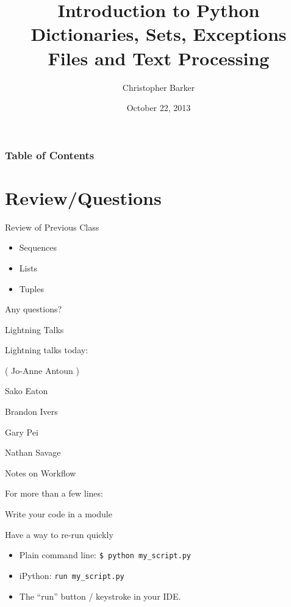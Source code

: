 \documentclass{beamer}
\title[Intro to Python: Week 4]{Introduction  to Python\\ Dictionaries, Sets, Exceptions\\ Files and Text Processing}
\author{Christopher Barker}
\institute{UW Continuing Education}
\date{October 22, 2013}
\begin{document}
\begin{frame}
  \titlepage
\end{frame}

\begin{frame}
\frametitle{Table of Contents}
  \tableofcontents
\end{frame}


\section{Review/Questions}

\begin{frame}{Review of Previous Class}

\begin{itemize}
  \item Sequences
  \item Lists
  \item Tuples
\end{itemize}

\vfill
{\Large Any questions?}

\end{frame}


\begin{frame}{Lightning Talks}

\vfill
{\LARGE Lightning talks today:}

\vfill
{\Large ( Jo-Anne Antoun )}

\vfill
{\Large
 Sako Eaton

\vfill
Brandon Ivers

\vfill
Gary Pei

\vfill
Nathan Savage

}
\vfill

\end{frame}


\begin{frame}[fragile]{Notes on Workflow}

  \vfill
  {\Large For more than a few lines:}

  \vfill
  {\large Write your code in a module}

  \vfill
  {\large Have a way to re-run quickly}
  \begin{itemize}
    \item Plain command line: \verb|$ python my_script.py|
    \item iPython: \verb|run my_script.py|
    \item The ``run'' button / keystroke in your IDE.
  \end{itemize}

  \vfill

\end{frame}
\end{document}
